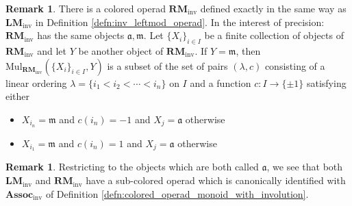 \documentclass{article}
\theoremstyle{definition}
\newtheorem{remark}[theorem]{Remark}
\begin{document}
\begin{remark}
    There is a colored operad $ \mathbf{RM}_{\mathrm{inv}} $ defined exactly in the same way as $ \mathbf{LM}_{\mathrm{inv}} $ in Definition \ref{defn:inv_leftmod_operad}. 
    In the interest of precision: $ \mathbf{RM}_{\mathrm{inv}} $ has the same objects $ \mathfrak{a}, \mathfrak{m} $. 
    Let $ \{X_i\}_{i \in I} $ be a finite collection of objects of $ \mathbf{RM}_{\mathrm{inv}} $ and let $ Y $ be another object of $ \mathbf{RM}_{\mathrm{inv}} $. 
    If $ Y = \mathfrak{m} $, then $ \mathrm{Mul}_{\mathbf{RM}_\mathrm{inv}} \left(\{X_i\}_{i \in I}, Y\right) $ is a subset of the set of pairs $ (\lambda, c) $ consisting of a linear ordering $ \lambda = \{i_1 < i_2 < \cdots < i_n\} $ on $ I $ and a function $ c\colon I \to \{\pm 1 \} $ satisfying either 
    \begin{itemize}
        \item  $ X_{i_n} = \mathfrak{m} $ and $ c(i_n) = -1 $ and $ X_{j} = \mathfrak{a} $ otherwise
        \item  $ X_{i_1} = \mathfrak{m} $ and $ c(i_n) = 1 $ and $ X_{j} = \mathfrak{a} $ otherwise
    \end{itemize}
\end{remark}
\begin{remark} %
    Restricting to the objects which are both called $ \mathfrak{a} $, we see that both $ \mathbf{LM}_\mathrm{inv} $ and $ \mathbf{RM}_{\mathrm{inv}} $ have a sub-colored operad which is canonically identified with $ \mathbf{Assoc}_\mathrm{inv} $ of Definition \ref{defn:colored_operad_monoid_with_involution}. 
\end{remark}
\end{document}
